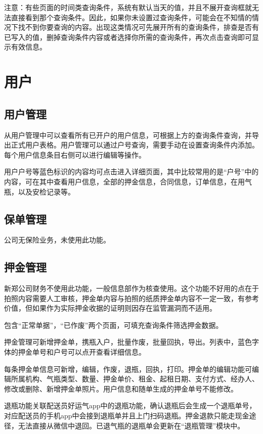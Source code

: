 \documentclass[UTF8]{ctexart}
\begin{document}
注意：有些页面的时间类查询条件，系统有默认当天的值，并且不展开查询框就无法直接看到那个查询条件。因此，如果你未设置过查询条件，可能会在不知情的情况下找不到你要查询的内容。出现这类情况可先展开所有的查询条件，排查是否有已写入的值，删掉查询条件内容或者选择你所需的查询条件，再次点击查询即可显示有效信息。

\section{用户}

\subsection{用户管理}
从用户管理中可以查看所有已开户的用户信息，可根据上方的查询条件查询，并导出正式用户表格。用户管理可以通过户号查询，需要手动在设置查询条件内添加。每个用户信息条目右侧可以进行编辑等操作。

用户户号等蓝色标识的内容均可点击进入详细页面，其中比较常用的是“户号”中的内容，可在其中查看用户信息，全部的押金信息，合同信息，订单信息，在用气瓶，以及安检记录等。

\subsection{保单管理}
公司无保险业务，未使用此功能。

\subsection{押金管理}
新郑公司财务不使用此功能，一般信息部作为核查使用。这个功能不好用的点在于拍照内容需要人工审核，押金单内容与拍照的纸质押金单内容不一定一致，有参考价值，但如果作为实际押金收据的证明则因存在监管漏洞而不适用。

包含“正常单据”，“已作废”两个页面，可填充查询条件筛选押金数据。

押金管理可新增押金单，携瓶入户，批量作废，批量回执，导出。列表中，蓝色字体的押金单号和户号可以点开查看详细信息。

每条押金单信息可新增，编辑，作废，退瓶，回执，打印。押金单的编辑功能可编辑所属机构、气瓶类型、数量、押金单价、租金、起租日期、支付方式、经办人、修改或删除、新增押金单照片。用户信息和随单生成的押金单号不能修改。

退瓶功能关联配送员好运气app中的退瓶功能，确认退瓶后会生成一个退瓶单号，对应配送员的手机app中会接到退瓶单并且上门扫码退瓶。押金退款只能走现金途径，无法直接从微信中退回。已退气瓶的退瓶单会更新在“退瓶管理”模块中。
\end{document}
